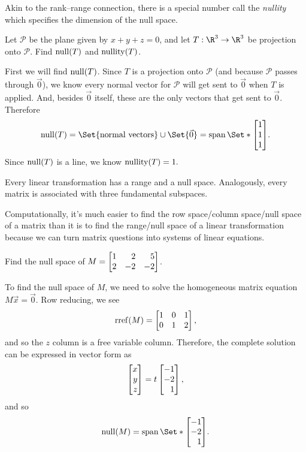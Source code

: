 Akin to the rank--range connection, there is a special number call the \emph{nullity} 
which specifies the dimension of the null space.


\begin{example}
	Let $\mathcal P$ be the plane given by $x+y+z=0$, and let $T:\R^3\to\R^3$ be projection onto $\mathcal P$.
	Find $\operatorname{null}(T)$ and $\operatorname{nullity}(T)$.

	\medskip
	First we will find $\operatorname{null}(T)$. Since $T$ is a projection onto $\mathcal P$ (and because $\mathcal P$ passes
	through $\vec 0$), we know every normal vector for $\mathcal P$ will get sent to $\vec 0$ when $T$ is applied.
	And, besides $\vec 0$ itself, these are the only vectors that get sent to $\vec 0$. Therefore
	\[
		\Null(T)=\Set{\text{normal vectors}}\cup\Set{\vec 0}=\Span\Set*{\mat{1\\1\\1}}.
	\]
	Since $\operatorname{null}(T)$ is a line, we know
	$
		\operatorname{nullity}(T)=1.
	$
\end{example}

Every linear transformation has a range and a null space. Analogously, every matrix is associated with
three fundamental subspaces.


Computationally, it's much easier to find the row space/column space/null space of a matrix than it is
to find the range/null space of a linear transformation because we can turn matrix questions into systems
of linear equations.

\begin{example}
	Find the null space of $M=\mat{1&2&5\\2&-2&-2}$.

	To find the null space of $M$, we need to solve the homogeneous matrix equation $M\vec x=\vec 0$.
	Row reducing, we see
	\[
		\Rref(M)=\mat{1&0&1\\0&1&2},
	\]
	and so the $z$ column is a free variable column. Therefore, the complete solution can be expressed in
	vector form as
	\[
		\mat{x\\y\\z}=t\mat{-1\\-2\\1},
	\]
	and so
	\[
		\Null(M)=\Span\Set*{\mat{-1\\-2\\1}}.
	\]
\end{example}


